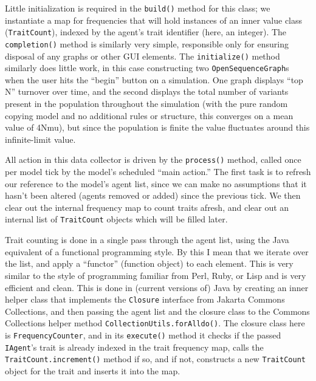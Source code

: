\documentclass{kluwer-mem-copyright}
\begin{document}
\begin{article}
Little initialization is required in the \texttt{build()} method for this class;
we instantiate a map for frequencies that will hold instances of an inner value
class (\texttt{TraitCount}), indexed by the agent's trait identifier (here, an
integer).  The \texttt{completion()} method is similarly very simple,
responsible only for ensuring disposal of any graphs or other GUI elements.  The
\texttt{initialize()} method similarly does little work, in this case
constructing two \texttt{OpenSequenceGraph}s when the user hits the ``begin''
button on a simulation.  One graph displays ``top N'' turnover over time, and
the second displays the total number of variants present in the population
throughout the simulation (with the pure random copying model and no additional
rules or structure, this converges on a mean value of 4Nmu), but since the
population is finite the value fluctuates around this infinite-limit value.

All action in this data collector is driven by the \texttt{process()} method,
called once per model tick by the model's scheduled ``main action.''  The first
task is to refresh our reference to the model's agent list, since we can make no
assumptions that it hasn't been altered (agents removed or added) since the
previous tick.  We then clear out the internal frequency map to count traits
afresh, and clear out an internal list of \texttt{TraitCount} objects which will
be filled later.  

Trait counting is done in a single pass through the agent list, using the Java
equivalent of a functional programming style.  By this I mean that we iterate
over the list, and apply a ``functor'' (function object) to each element.  This
is very similar to the style of programming familiar from Perl, Ruby, or Lisp
and is very efficient and clean.  This is done in (current versions of) Java by
creating an inner helper class that implements the \texttt{Closure} interface
from Jakarta Commons Collections, and then passing the agent list and the
closure class to the Commons Collections helper method
\texttt{CollectionUtils.forAlldo()}.  The closure class here is
\texttt{FrequencyCounter}, and in its \texttt{execute()} method it checks if the
passed \texttt{IAgent}'s trait is already indexed in the trait frequency map,
calls the \texttt{TraitCount.increment()} method if so, and if not, constructs a
new \texttt{TraitCount} object for the trait and inserts it into the map.


\end{article}
\end{document}
